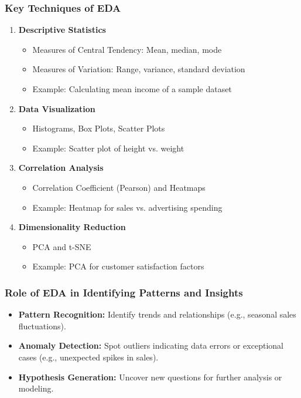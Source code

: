 \documentclass{beamer}
\begin{document}
\begin{frame}
    \frametitle{Key Techniques of EDA}
    \begin{enumerate}
        \item \textbf{Descriptive Statistics}
            \begin{itemize}
                \item Measures of Central Tendency: Mean, median, mode
                \item Measures of Variation: Range, variance, standard deviation
                \item Example: Calculating mean income of a sample dataset
            \end{itemize}
        \item \textbf{Data Visualization}
            \begin{itemize}
                \item Histograms, Box Plots, Scatter Plots
                \item Example: Scatter plot of height vs. weight
            \end{itemize}
        \item \textbf{Correlation Analysis}
            \begin{itemize}
                \item Correlation Coefficient (Pearson) and Heatmaps
                \item Example: Heatmap for sales vs. advertising spending
            \end{itemize}
        \item \textbf{Dimensionality Reduction}
            \begin{itemize}
                \item PCA and t-SNE
                \item Example: PCA for customer satisfaction factors
            \end{itemize}
    \end{enumerate}
\end{frame}

\begin{frame}
    \frametitle{Role of EDA in Identifying Patterns and Insights}
    \begin{itemize}
        \item \textbf{Pattern Recognition:} Identify trends and relationships (e.g., seasonal sales fluctuations).
        \item \textbf{Anomaly Detection:} Spot outliers indicating data errors or exceptional cases (e.g., unexpected spikes in sales).
        \item \textbf{Hypothesis Generation:} Uncover new questions for further analysis or modeling.
    \end{itemize}
\end{frame}
\end{document}

